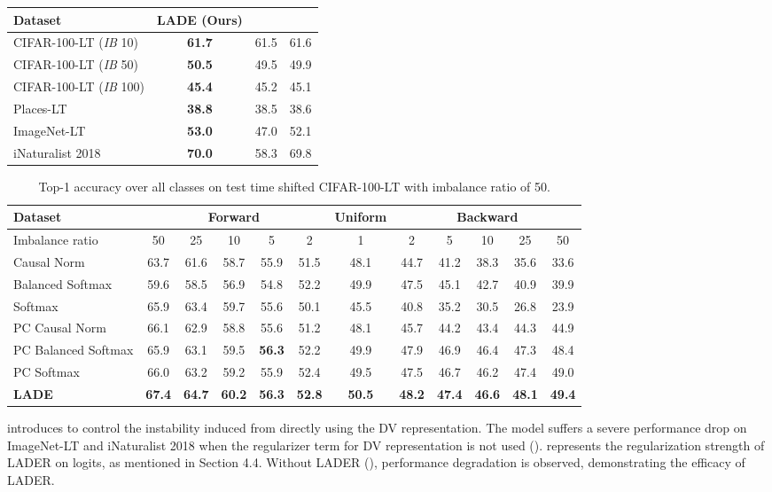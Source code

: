 \documentclass[final]{cvpr}
\begin{document}
\begin{table}[h]
\vspace{0pt}
{
\begin{tabular}{l c c c}
\toprule
Dataset & LADE (Ours) &  &  \\
\midrule
CIFAR-100-LT (\textit{IB} 10) & \textbf{61.7} & 61.5 & 61.6\\
CIFAR-100-LT (\textit{IB} 50) & \textbf{50.5} & 49.5 & 49.9\\
CIFAR-100-LT (\textit{IB} 100) & \textbf{45.4} & 45.2 & 45.1\\
Places-LT & \textbf{38.8} & 38.5 & 38.6\\
ImageNet-LT & \textbf{53.0} & 47.0 & 52.1\\
iNaturalist 2018 & \textbf{70.0} & 58.3 & 69.8 \\
\bottomrule
\end{tabular}
}
\label{tab:ablation}
\vspace{0mm}
\end{table} \begin{table*}[t]
\footnotesize
\centering
\caption{Top-1 accuracy over all classes on test time shifted CIFAR-100-LT with imbalance ratio of 50.}
\vspace{0px}
{
	\begin{tabular}{l|ccccc|c|ccccc}
    \toprule
    Dataset & \multicolumn{5}{c|}{Forward} & Uniform & \multicolumn{5}{c}{Backward}\\
    \midrule
    Imbalance ratio & 50 & 25 & 10 & 5 & 2 & 1 & 2 & 5 & 10 & 25 & 50 \\
    \midrule
	Causal Norm & 63.7 & 61.6 & 58.7 & 55.9 & 51.5 & 48.1 & 44.7 & 41.2 & 38.3 & 35.6 & 33.6 \\
	Balanced Softmax & 59.6 & 58.5 & 56.9 & 54.8 & 52.2 & 49.9 & 47.5 & 45.1 & 42.7 & 40.9 & 39.9 \\
	Softmax & 65.9 & 63.4 & 59.7 & 55.6 & 50.1 & 45.5 & 40.8 & 35.2 & 30.5 & 26.8 & 23.9 \\
    \midrule
	PC Causal Norm & 66.1 & 62.9 & 58.8 & 55.6 & 51.2 & 48.1 & 45.7 & 44.2 & 43.4 & 44.3 & 44.9 \\
	PC Balanced Softmax & 65.9 & 63.1 & 59.5 & \textbf{56.3} & 52.2 & 49.9 & 47.9 & 46.9 & 46.4 & 47.3 & 48.4 \\
	PC Softmax & 66.0 & 63.2 & 59.2 & 55.9 & 52.4 & 49.5 & 47.5 & 46.7 & 46.2 & 47.4 & 49.0 \\
    \midrule
	\textbf{LADE} & \textbf{67.4} & \textbf{64.7} & \textbf{60.2} & \textbf{56.3} & \textbf{52.8} & \textbf{50.5} & \textbf{48.2} & \textbf{47.4} & \textbf{46.6} & \textbf{48.1} & \textbf{49.4} \\
	\bottomrule
	\end{tabular}
}
\label{tab:cifar100_imb0.02_shift}
\vspace{0mm}
\end{table*} 
\cite{choi2020regularized} introduces  to control the instability induced from directly using the DV representation.
The model suffers a severe performance drop on ImageNet-LT and iNaturalist 2018 when the regularizer term for DV representation is not used ().
 represents the regularization strength of LADER on logits, as mentioned in Section 4.4.
Without LADER (), performance degradation is observed, demonstrating the efficacy of LADER.
\end{document}
